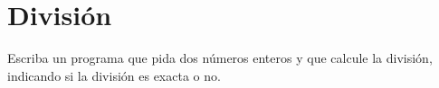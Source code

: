 \section{División}

Escriba un programa que pida dos números enteros y que calcule la
división, indicando si la división es exacta o no.
